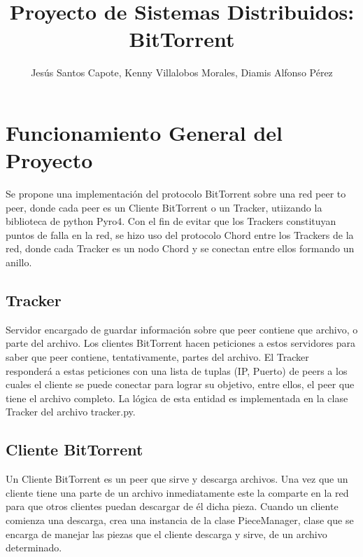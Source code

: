 \documentclass[article]{llncs}
\begin{document}
%
\title{Proyecto de Sistemas Distribuidos: BitTorrent}
%
%
\author{Jes\'us Santos Capote, Kenny Villalobos Morales, Diamis Alfonso P\'erez}
%
%
\maketitle              %
%

\section{Funcionamiento General del Proyecto}
Se propone una implementación del protocolo BitTorrent sobre una red peer to peer, donde cada peer es un 
Cliente BitTorrent o un Tracker, utiizando la biblioteca de python Pyro4. Con el fin de evitar que los Trackers
constituyan puntos de falla en la red, se hizo uso del protocolo Chord entre los Trackers de la red, donde cada 
Tracker es un nodo Chord y se conectan entre ellos formando un anillo.

\subsection{Tracker}
Servidor encargado de guardar información sobre que peer contiene que archivo, o parte del archivo. Los clientes 
BitTorrent hacen peticiones a estos servidores para saber que peer contiene, tentativamente, partes del archivo. El Tracker
responderá a estas peticiones con una lista de tuplas (IP, Puerto) de peers a los cuales el cliente se puede conectar para 
lograr su objetivo, entre ellos, el peer que tiene el archivo completo. La lógica de esta entidad es implementada en la clase 
Tracker del archivo tracker.py.

\subsection{Cliente BitTorrent}
Un Cliente BitTorrent es un peer que sirve y descarga archivos. Una vez que un cliente tiene una parte de un archivo 
inmediatamente este la comparte en la red para que otros clientes puedan descargar de él dicha pieza. Cuando un cliente 
comienza una descarga, crea una instancia de la clase PieceManager, clase que se encarga de manejar las piezas que el cliente 
descarga y sirve, de un archivo determinado.
\end{document}
